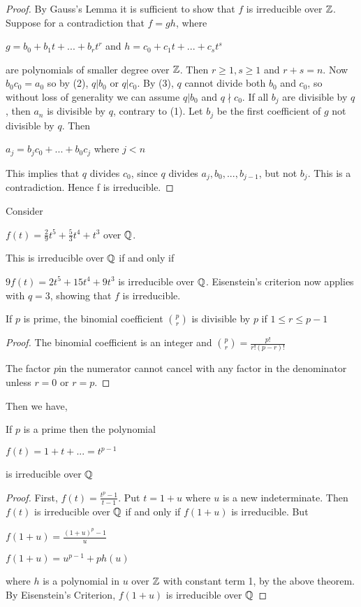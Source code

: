 \begin{proof}
By Gauss's Lemma it is sufficient to show that $f$ is irreducible over $\mathbb Z$. Suppose for a contradiction that $f = gh$, where

$g=b_0+b_1 t+ ... +b_r t^r$ and $h=c_0+c_1 t+ ... +c_s t^s$

are polynomials of smaller degree over $\mathbb Z$. Then $r \ge 1, s \ge 1$ and $r+s = n$. Now $b_0 c_0 = a_0$ so by (2), $q | b_0$ or $q|c_0$. By (3), $q$ cannot divide both $b_0$ and $c_0$, so without
loss of generality we can assume $q | b_0$ and $q \nmid c_0$. If all $b_j$ are divisible by $q$, then $a_n$ is divisible by $q$, contrary to (1). Let $b_j$ be the first coefficient of $g$ not divisible by $q$. Then

$a_j = b_j c_0 + ...+ b_0 c_j$ where $j < n$

 This implies that $q$ divides $c_0$, since $q$ divides $a_j, b_0,..., b_{j-1}$, but not $b_j$. This is a contradiction. Hence f is irreducible.
\end{proof}

\begin{example}
Consider

$f(t) = \frac{2}{9} t^5 + \frac{5}{3} t^4 + t^3$ over $\mathbb Q$.

This is irreducible over $\mathbb Q$ if and only if

$9f(t) = 2t^5 + 15t^4 + 9t^3$ is irreducible over $\mathbb Q$. Eisenstein's criterion now applies with $q = 3$, showing that $f$ is irreducible.
\end{example}

\begin{theorem}
If $p$ is prime, the binomial coefficient $\binom{p}{r}$ is divisible by $p$ if $1 \le r \le p-1$
\end{theorem}

\begin{proof}
The binomial coefficient is an integer and $\binom{p}{r} = \frac{p!}{r!(p-r)!}$

The factor $p$in the numerator cannot cancel with any factor in the denominator unless $r=0$ or $r=p$.
\end{proof}

Then we have,

\begin{theorem}
    If $p$ is a prime then the polynomial

    $f(t) = 1 + t + ... = t^{p-1}$

    is irreducible over $\mathbb Q$
\end{theorem}

\begin{proof}
First, $f(t) = \frac{t^p - 1}{t - 1}$. Put $t = 1 + u$ where $u$ is a new indeterminate. Then $f(t)$ is irreducible over $\mathbb Q$ if and only if $f(1+u)$ is irreducible. But

$f(1+u) = \frac{(1+u)^p - 1}{u}$

$f(1+u) = u^{p-1} + ph(u)$

where $h$ is a polynomial in $u$ over $\mathbb Z$ with constant term 1, by the above theorem. By Eisenstein's Criterion, $f(1+u)$ is irreducible over $\mathbb Q$

\end{proof}
